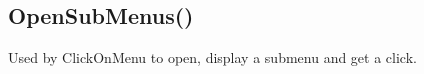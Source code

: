 \documentclass[letterpaper,10pt,english]{sphinxmanual}
\begin{document}
\sphinxAtStartPar
{}

\sphinxAtStartPar
{}

\ignorespaces 

\subsection{OpenSubMenus()}
\label{\detokenize{reference/ui:opensubmenus}}\label{\detokenize{reference/ui:index-21}}
\sphinxAtStartPar
{}

\sphinxAtStartPar
{}

\sphinxAtStartPar
Used by ClickOnMenu to open, display a submenu and get a click.

\sphinxAtStartPar
{}

\begin{sphinxVerbatim}[commandchars=\\\{\}]
\end{sphinxVerbatim}

\sphinxAtStartPar
{}
\end{document}
